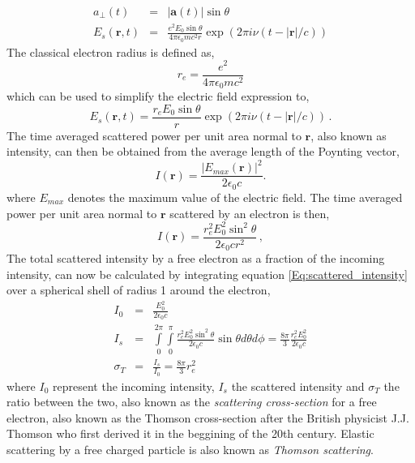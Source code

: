 \begin{eqnarray}
a_{\perp}(t) & = & |\mathbf a(t)| \sin \theta  \\
E_s(\mathbf r,t) & = & \frac{e^2 E_0 \sin \theta }{4 \pi \epsilon_0 m c^2 r} \exp(2 \pi i \nu (t -| \mathbf r|/c)) 
\label{Eq:scattering_by_electron}
\end{eqnarray}
The classical electron radius is defined as,
\begin{equation}
r_e = \frac{e^2}{4 \pi \epsilon_0 m c^2}
\end{equation}
which can be used to simplify the electric field expression to,
\begin{equation}
E_s(\mathbf r,t) = \frac{r_e E_0 \sin \theta }{r} \exp(2 \pi i \nu (t -| \mathbf
r|/c))  \, .
\label{Eq:scattering_by_electron_simplified}
\end{equation}
The time averaged scattered power per unit area normal to $\mathbf r$, also
known as intensity, can then be obtained from the average length of the Poynting vector,
\begin{equation} 
I(\mathbf r) = \frac{ |E_{max}(\mathbf r)|^2 }{2 \epsilon_0 c} .
\label{Eq:poynting_vector}
\end{equation}
where $E_{max}$ denotes the maximum value of the electric field.
The time averaged power per unit area normal to $\mathbf r$ scattered by an electron is then,
\begin{equation}
I(\mathbf r)  = \frac{r_e^2 E_0^2 \sin^2 \theta }{2 \epsilon_0 c r^2} \, ,
\label{Eq:scattered_intensity}
\end{equation}
The total scattered intensity by a free electron as a fraction of the incoming
intensity, can now be calculated by integrating equation
\ref{Eq:scattered_intensity} over a spherical shell of radius 1 around the electron,
\begin{eqnarray}
I_0 & = & \frac{E_0^2}{2 \epsilon_0 c} \\
I_s & = & \int\limits_0^{2 \pi} \int\limits_0^{\pi} \frac{r_e^2 E_0^2 \sin^2
  \theta }{2 \epsilon_0 c} \sin \theta d \theta d\phi = \frac{8 \pi}{3}
\frac{r_e^2 E_0^2}{2 \epsilon_0 c} \\
\sigma_T & = & \frac{I_s}{I_0} = \frac{8 \pi}{3} r_e^2
\end{eqnarray}
where $I_0$ represent the incoming intensity, $I_s$ the scattered intensity and
$\sigma_T$ the ratio between the two, also known as the {\em scattering cross-section}
for a free electron, also known as the Thomson cross-section after the British
physicist J.J. Thomson who first derived it in the beggining of the 20th
century. Elastic scattering by a free charged particle is also known as {\em Thomson scattering}.

